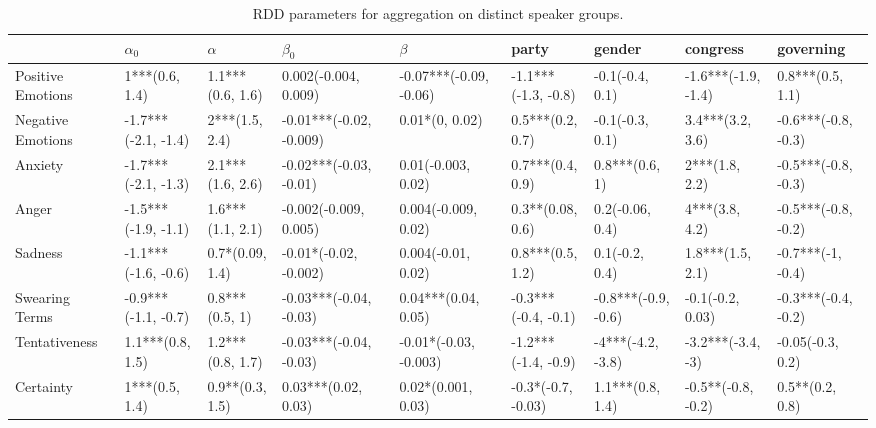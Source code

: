 \begin{table}[h]\centering
\caption{RDD parameters for aggregation on distinct speaker groups.}
	\label{fig: Attributes_1}
\begin{adjustbox}{width=\linewidth, center}
	\begin{tabular}{lllllllll}
	\toprule
	{} &           $\alpha_0$ &             $\alpha$ &                $\beta_0$ &                 $\beta$ &                party &               gender &             congress &            governing \\
	\midrule
	Positive Emotions     &       1***(0.6, 1.4) &     1.1***(0.6, 1.6) &     0.002(-0.004, 0.009) &  -0.07***(-0.09, -0.06) &  -1.1***(-1.3, -0.8) &      -0.1(-0.4, 0.1) &  -1.6***(-1.9, -1.4) &     0.8***(0.5, 1.1) \\
	Negative Emotions     &  -1.7***(-2.1, -1.4) &       2***(1.5, 2.4) &  -0.01***(-0.02, -0.009) &          0.01*(0, 0.02) &     0.5***(0.2, 0.7) &      -0.1(-0.3, 0.1) &     3.4***(3.2, 3.6) &  -0.6***(-0.8, -0.3) \\
	Anxiety               &  -1.7***(-2.1, -1.3) &     2.1***(1.6, 2.6) &   -0.02***(-0.03, -0.01) &      0.01(-0.003, 0.02) &     0.7***(0.4, 0.9) &       0.8***(0.6, 1) &       2***(1.8, 2.2) &  -0.5***(-0.8, -0.3) \\
	Anger                 &  -1.5***(-1.9, -1.1) &     1.6***(1.1, 2.1) &    -0.002(-0.009, 0.005) &     0.004(-0.009, 0.02) &     0.3**(0.08, 0.6) &      0.2(-0.06, 0.4) &       4***(3.8, 4.2) &  -0.5***(-0.8, -0.2) \\
	Sadness               &  -1.1***(-1.6, -0.6) &      0.7*(0.09, 1.4) &    -0.01*(-0.02, -0.002) &      0.004(-0.01, 0.02) &     0.8***(0.5, 1.2) &       0.1(-0.2, 0.4) &     1.8***(1.5, 2.1) &    -0.7***(-1, -0.4) \\
	Swearing Terms        &  -0.9***(-1.1, -0.7) &       0.8***(0.5, 1) &   -0.03***(-0.04, -0.03) &     0.04***(0.04, 0.05) &  -0.3***(-0.4, -0.1) &  -0.8***(-0.9, -0.6) &     -0.1(-0.2, 0.03) &  -0.3***(-0.4, -0.2) \\
	Tentativeness         &     1.1***(0.8, 1.5) &     1.2***(0.8, 1.7) &   -0.03***(-0.04, -0.03) &   -0.01*(-0.03, -0.003) &  -1.2***(-1.4, -0.9) &    -4***(-4.2, -3.8) &    -3.2***(-3.4, -3) &     -0.05(-0.3, 0.2) \\
	Certainty             &       1***(0.5, 1.4) &      0.9**(0.3, 1.5) &      0.03***(0.02, 0.03) &      0.02*(0.001, 0.03) &   -0.3*(-0.7, -0.03) &     1.1***(0.8, 1.4) &   -0.5**(-0.8, -0.2) &      0.5**(0.2, 0.8) \\

\end{tabular}
\end{adjustbox}
\end{table}
